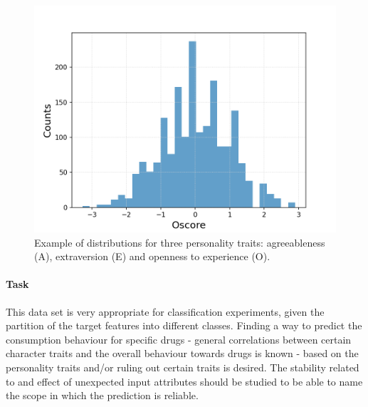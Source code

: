 \documentclass{article}
\begin{document}
\begin{figure}[h!]
\begin{minipage}[b]{0.32\textwidth}
	\end{minipage}
	\begin{minipage}[b]{0.32\textwidth}
		\includegraphics[width=\textwidth]{plots/drugsPlots/Oscore.png}
	\end{minipage}
	\caption{Example of distributions for three personality traits:  agreeableness (A), extraversion (E) and openness to experience (O).}
	\label{drugs3}
\end{figure}


\clearpage
\paragraph{Task}

This data set is very appropriate for classification experiments, given the partition of the target features into different classes. Finding a way to predict the consumption behaviour for specific drugs - general correlations between certain character traits and the overall behaviour towards drugs is known\cite{Roncero2014NeuroticismAW}\cite{Vollrath2002WhoTH}\cite{Flory2002TheRA} - based on the personality traits and/or ruling out certain traits is desired. The stability related to and effect of unexpected input attributes should be studied to be able to name the scope in which the prediction is reliable.


\clearpage
{}

\end{document}
